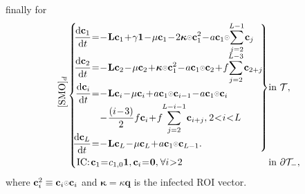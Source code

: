 \documentclass{article}
\begin{document}
                finally for \SMOcontinuous{}
                \begin{equation}
                    \refstepcounter{equation}
                    \label{eqSMODiscrete}
                    \SpazMate{1}{1}{1}
                    \vcenter{\hbox{\rotatebox{90}{\hspace{7.5pt}[SMO]$_d$}}}
                    \left\{
                    \begin{alignedat}{2}
                        &\hspace{-.2cm plus .1cm minus .1cm}
                        \left.\begin{aligned}
                            \derT{\mathbf c_1}t=&-\mathbf L\mathbf c_1
                            +\gamma\bOne-\mu\mathbf c_1%
                            -2\boldsymbol\kappa\HadProd\mathbf c_1^2
                            -a\mathbf c_1\HadProd\!\!\sum_{j=2}^{L-1}\mathbf c_j\\[\vspcESMO]
                            \derT{\mathbf c_2}t=&-\mathbf L\mathbf c_2
                            -\mu\mathbf c_2+\boldsymbol\kappa\HadProd\mathbf c_1^2%
                            -a\mathbf c_1\HadProd\mathbf c_2+
                            f\!\!\sum_{j=2}^{L-3}\mathbf c_{2+j}\\[\vspcESMO]
                            \derT{\mathbf c_i}t=&-\mathbf L\mathbf c_i
                            -\mu\mathbf c_i+a\mathbf c_1\HadProd\mathbf c_{i-1}
                            -a\mathbf c_1\HadProd\mathbf c_i\\[\vspcRSMO]&
                            -\frac{(i-3)}2f\mathbf c_i+
                            f\!\!\sum_{j=2}^{L-i-1}\mathbf c_{i+j},
                            \;\;\;2<i<L\\[\vspcESMO]
                            \derT{\mathbf c_L}t=&-\mathbf L\mathbf c_L
                            -\mu\mathbf c_L+a\mathbf c_1\HadProd\mathbf c_{L-1}.
                        \end{aligned}\hColla{-.1}{.05}{cm}\right\}
                        &&\text{in }\mathcal T,\\
                        &\text{IC:}\;\;
                        \mathbf c_1=c_{1,0}\boldsymbol1,\;\;
                        \mathbf c_i=\boldsymbol0,\;\;\;\forall i>2
                        &&\text{in }\partial\mathcal T_-,
                    \end{alignedat}
                    \right.\notag%
                \end{equation}
                where $\mathbf c_i^2\equiv\mathbf c_i\HadProd\mathbf c_i$ and $\boldsymbol\kappa=\kappa\mathbf q$ is the infected ROI vector.
\end{document}
